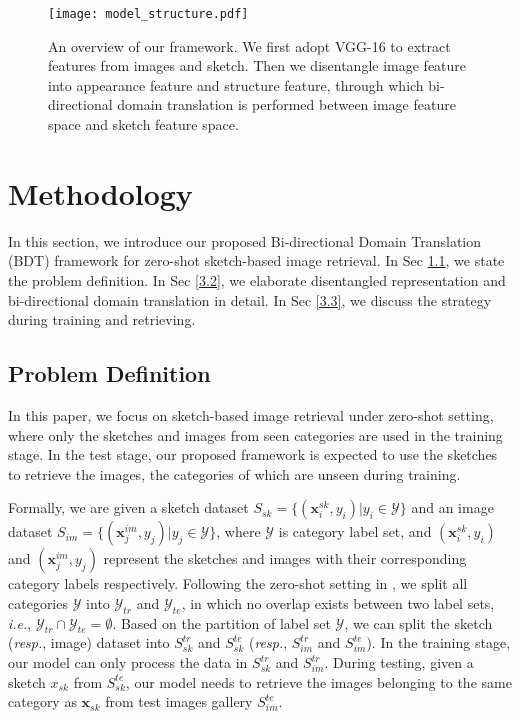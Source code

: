 \documentclass[10pt,twocolumn,letterpaper]{article}
\begin{document}
\begin{figure*}
\centering
\texttt{[image: model\_structure.pdf]}   
\caption{An overview of our framework. We first adopt VGG-16 \cite{simonyan2014very} to extract features from images and sketch. Then we disentangle image feature into appearance feature and structure feature, through which bi-directional domain translation is performed between image feature space and sketch feature space.}
\label{fig:structure}
\vspace{-10pt}
\end{figure*}

\section{Methodology}
In this section, we introduce our proposed Bi-directional Domain Translation (BDT) framework for zero-shot sketch-based image retrieval. In Sec \ref{3.1}, we state the problem definition. In Sec \ref{3.2}, we elaborate disentangled representation and bi-directional domain translation in detail. In Sec \ref{3.3}, we discuss the strategy during training and retrieving.

\subsection{Problem Definition} \label{3.1}
In this paper, we focus on sketch-based image retrieval under zero-shot setting, where only the sketches and images from seen categories are used in the training stage. 
In the test stage, our proposed framework is expected to use the sketches to retrieve the images, the categories of which are unseen during training.

Formally, we are given a sketch dataset $S_{sk}=\{(\mathbf{x}_i^{sk}, y_i)|y_i \in \mathcal{Y}\}$ and an image dataset $S_{im}=\{(\mathbf{x}_j^{im}, y_j) | y_j \in \mathcal{Y}\}$, where $\mathcal{Y}$ is category label set, and $(\mathbf{x}_i^{sk}, y_i)$ and $(\mathbf{x}_j^{im}, y_j)$ represent the sketches and images with their corresponding category labels respectively.
Following the zero-shot setting in \cite{yelamarthi2018zero,wang2019stacked}, we split all categories $\mathcal{Y}$ into $\mathcal{Y}_{tr}$ and $\mathcal{Y}_{te}$, in which no overlap exists between two label sets, \emph{i.e.}, $\mathcal{Y}_{tr} \cap \mathcal{Y}_{te} = \emptyset$. 
Based on the partition of label set $\mathcal{Y}$, we can split the sketch (\emph{resp.}, image) dataset into $S^{tr}_{sk}$ and $S^{te}_{sk}$ (\emph{resp.}, $S^{tr}_{im}$ and $S^{te}_{im}$).
In the training stage, our model can only process the data in $S^{tr}_{sk}$ and $S_{im}^{tr}$. 
During testing, given a sketch $x_{sk}$ from $S^{te}_{sk}$, our model needs to retrieve the images belonging to the same category as $\mathbf{x}_{sk}$ from test images gallery $S^{te}_{im}$.
\end{document}
